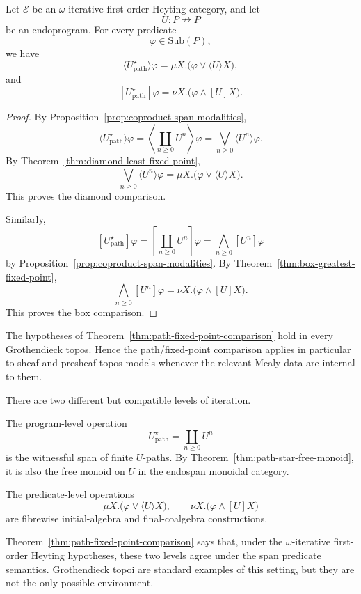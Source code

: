 \begin{theorem}
\label{thm:path-fixed-point-comparison}
Let \(\mathcal E\) be an \(\omega\)-iterative first-order Heyting category, and let
\[
U:P\nrightarrow P
\]
be an endoprogram. For every predicate
\[
\varphi\in\mathrm{Sub}(P),
\]
we have
\[
\langle U^\star_{\mathrm{path}}\rangle\varphi
=
\mu X.\bigl(\varphi\vee\langle U\rangle X\bigr),
\]
and
\[
[U^\star_{\mathrm{path}}]\varphi
=
\nu X.\bigl(\varphi\wedge[U]X\bigr).
\]
\end{theorem}

\begin{proof}
By Proposition~\ref{prop:coproduct-span-modalities},
\[
\langle U^\star_{\mathrm{path}}\rangle\varphi
=
\left\langle\coprod_{n\ge0}U^n\right\rangle\varphi
=
\bigvee_{n\ge0}\langle U^n\rangle\varphi.
\]
By Theorem~\ref{thm:diamond-least-fixed-point},
\[
\bigvee_{n\ge0}\langle U^n\rangle\varphi
=
\mu X.\bigl(\varphi\vee\langle U\rangle X\bigr).
\]
This proves the diamond comparison.

Similarly,
\[
[U^\star_{\mathrm{path}}]\varphi
=
\left[\coprod_{n\ge0}U^n\right]\varphi
=
\bigwedge_{n\ge0}[U^n]\varphi
\]
by Proposition~\ref{prop:coproduct-span-modalities}. By Theorem~\ref{thm:box-greatest-fixed-point},
\[
\bigwedge_{n\ge0}[U^n]\varphi
=
\nu X.\bigl(\varphi\wedge[U]X\bigr).
\]
This proves the box comparison.
\end{proof}

\begin{corollary}
\label{cor:grothendieck-topos-path-fixed-point-comparison}
The hypotheses of Theorem~\ref{thm:path-fixed-point-comparison} hold in every Grothendieck topos. Hence the path/fixed-point comparison applies in particular to sheaf and presheaf topos models whenever the relevant Mealy data are internal to them.
\end{corollary}

\begin{remark}
\label{rem:path-versus-fixed-point}
There are two different but compatible levels of iteration.

The program-level operation
\[
U^\star_{\mathrm{path}}
=
\coprod_{n\ge0}U^n
\]
is the witnessful span of finite \(U\)-paths. By Theorem~\ref{thm:path-star-free-monoid}, it is also the free monoid on \(U\) in the endospan monoidal category.

The predicate-level operations
\[
\mu X.\bigl(\varphi\vee\langle U\rangle X\bigr),
\qquad
\nu X.\bigl(\varphi\wedge[U]X\bigr)
\]
are fibrewise initial-algebra and final-coalgebra constructions.

Theorem~\ref{thm:path-fixed-point-comparison} says that, under the \(\omega\)-iterative first-order Heyting hypotheses, these two levels agree under the span predicate semantics. Grothendieck topoi are standard examples of this setting, but they are not the only possible environment.
\end{remark}

